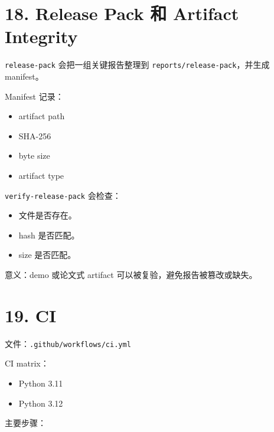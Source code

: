 \documentclass[UTF8,12pt,openany]{ctexbook}
\begin{document}
\section{18. Release Pack 和 Artifact Integrity}

\texttt{release-pack} 会把一组关键报告整理到 \texttt{reports/release-pack}，并生成 manifest。\par

Manifest 记录：\par

\begin{itemize}
\item artifact path
\item SHA-256
\item byte size
\item artifact type
\end{itemize}

\texttt{verify-release-pack} 会检查：\par

\begin{itemize}
\item 文件是否存在。
\item hash 是否匹配。
\item size 是否匹配。
\end{itemize}

意义：demo 或论文式 artifact 可以被复验，避免报告被篡改或缺失。\par

\section{19. CI}

文件：\texttt{.github/workflows/ci.yml}\par

CI matrix：\par

\begin{itemize}
\item Python 3.11
\item Python 3.12
\end{itemize}

主要步骤：\par
\end{document}
